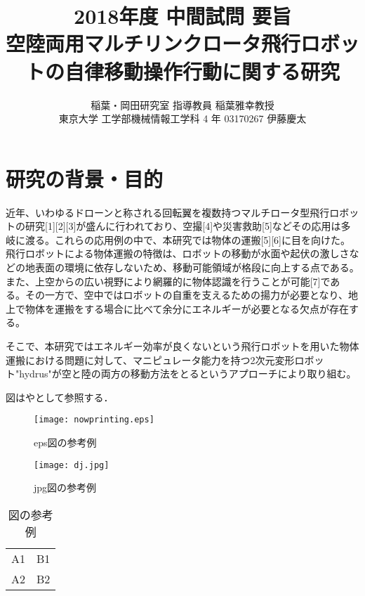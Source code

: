 \documentclass[twocolumn]{preport}
\title{2018年度 中間試問 要旨 \\
空陸両用マルチリンクロータ飛行ロボットの自律移動操作行動に関する研究}
\author{稲葉・岡田研究室 指導教員 稲葉雅幸教授 \\
東京大学 工学部機械情報工学科 4 年 03170267 伊藤慶太}
\begin{document}
\pagestyle{empty}
\maketitle
\thispagestyle{empty}
\sloppy

\section{研究の背景・目的}
近年、いわゆるドローンと称される回転翼を複数持つマルチロータ型飛行ロボットの研究\cite{Sakai}[1][2][3]が盛んに行われており、空撮[4]や災害救助[5]などその応用は多岐に渡る。これらの応用例の中で、本研究では物体の運搬[5][6]に目を向けた。飛行ロボットによる物体運搬の特徴は、ロボットの移動が水面や起伏の激しさなどの地表面の環境に依存しないため、移動可能領域が格段に向上する点である。また、上空からの広い視野により網羅的に物体認識を行うことが可能[7]である。その一方で、空中ではロボットの自重を支えるための揚力が必要となり、地上で物体を運搬をする場合に比べて余分にエネルギーが必要となる欠点が存在する。

そこで、本研究ではエネルギー効率が良くないという飛行ロボットを用いた物体運搬における問題に対して、マニピュレータ能力を持つ2次元変形ロボット"hydrus"が空と陸の両方の移動方法をとるというアプローチにより取り組む。


図はやとして参照する．

\begin{figure}[tbh]
 \begin{center}
  \begin{minipage}{0.3\columnwidth}
   \texttt{[image: nowprinting.eps]}
   \caption{eps図の参考例}
  \end{minipage}
  \hspace{0.15\columnwidth}
  \begin{minipage}{0.3\columnwidth}
   \texttt{[image: dj.jpg]}
   \caption{jpg図の参考例}
  \end{minipage}
  \label{figure:nowprinting}
 \end{center}
\end{figure}

\begin{table}[tbh]
 \begin{center}
  \begin{tabular}{|l|r|} \hline
  A1 & B1 \\
  A2 & B2 \\ \hline
  \end{tabular}
  \caption{図の参考例}
  \label{table:sample}
 \end{center}
\end{table}
\end{document}
